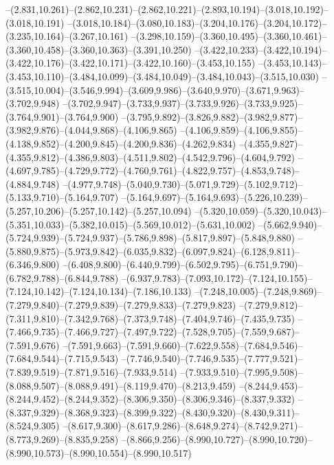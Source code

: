   --(2.831,10.261)--(2.862,10.231)--(2.862,10.221)--(2.893,10.194)--(3.018,10.192)--(3.018,10.191)%
  --(3.018,10.184)--(3.080,10.183)--(3.204,10.176)--(3.204,10.172)--(3.235,10.164)--(3.267,10.161)%
  --(3.298,10.159)--(3.360,10.495)--(3.360,10.461)--(3.360,10.458)--(3.360,10.363)--(3.391,10.250)%
  --(3.422,10.233)--(3.422,10.194)--(3.422,10.176)--(3.422,10.171)--(3.422,10.160)--(3.453,10.155)%
  --(3.453,10.143)--(3.453,10.110)--(3.484,10.099)--(3.484,10.049)--(3.484,10.043)--(3.515,10.030)%
  --(3.515,10.004)--(3.546,9.994)--(3.609,9.986)--(3.640,9.970)--(3.671,9.963)--(3.702,9.948)%
  --(3.702,9.947)--(3.733,9.937)--(3.733,9.926)--(3.733,9.925)--(3.764,9.901)--(3.764,9.900)%
  --(3.795,9.892)--(3.826,9.882)--(3.982,9.877)--(3.982,9.876)--(4.044,9.868)--(4.106,9.865)%
  --(4.106,9.859)--(4.106,9.855)--(4.138,9.852)--(4.200,9.845)--(4.200,9.836)--(4.262,9.834)%
  --(4.355,9.827)--(4.355,9.812)--(4.386,9.803)--(4.511,9.802)--(4.542,9.796)--(4.604,9.792)%
  --(4.697,9.785)--(4.729,9.772)--(4.760,9.761)--(4.822,9.757)--(4.853,9.748)--(4.884,9.748)%
  --(4.977,9.748)--(5.040,9.730)--(5.071,9.729)--(5.102,9.712)--(5.133,9.710)--(5.164,9.707)%
  --(5.164,9.697)--(5.164,9.693)--(5.226,10.239)--(5.257,10.206)--(5.257,10.142)--(5.257,10.094)%
  --(5.320,10.059)--(5.320,10.043)--(5.351,10.033)--(5.382,10.015)--(5.569,10.012)--(5.631,10.002)%
  --(5.662,9.940)--(5.724,9.939)--(5.724,9.937)--(5.786,9.898)--(5.817,9.897)--(5.848,9.880)%
  --(5.880,9.875)--(5.973,9.842)--(6.035,9.832)--(6.097,9.824)--(6.128,9.811)--(6.346,9.800)%
  --(6.408,9.800)--(6.440,9.799)--(6.502,9.795)--(6.751,9.790)--(6.782,9.788)--(6.844,9.788)%
  --(6.937,9.783)--(7.093,10.172)--(7.124,10.155)--(7.124,10.142)--(7.124,10.134)--(7.186,10.133)%
  --(7.248,10.005)--(7.248,9.869)--(7.279,9.840)--(7.279,9.839)--(7.279,9.833)--(7.279,9.823)%
  --(7.279,9.812)--(7.311,9.810)--(7.342,9.768)--(7.373,9.748)--(7.404,9.746)--(7.435,9.735)%
  --(7.466,9.735)--(7.466,9.727)--(7.497,9.722)--(7.528,9.705)--(7.559,9.687)--(7.591,9.676)%
  --(7.591,9.663)--(7.591,9.660)--(7.622,9.558)--(7.684,9.546)--(7.684,9.544)--(7.715,9.543)%
  --(7.746,9.540)--(7.746,9.535)--(7.777,9.521)--(7.839,9.519)--(7.871,9.516)--(7.933,9.514)%
  --(7.933,9.510)--(7.995,9.508)--(8.088,9.507)--(8.088,9.491)--(8.119,9.470)--(8.213,9.459)%
  --(8.244,9.453)--(8.244,9.452)--(8.244,9.352)--(8.306,9.350)--(8.306,9.346)--(8.337,9.332)%
  --(8.337,9.329)--(8.368,9.323)--(8.399,9.322)--(8.430,9.320)--(8.430,9.311)--(8.524,9.305)%
  --(8.617,9.300)--(8.617,9.286)--(8.648,9.274)--(8.742,9.271)--(8.773,9.269)--(8.835,9.258)%
  --(8.866,9.256)--(8.990,10.727)--(8.990,10.720)--(8.990,10.573)--(8.990,10.554)--(8.990,10.517)%
